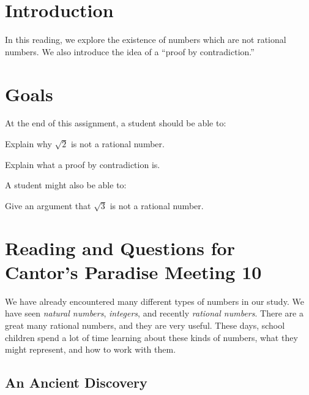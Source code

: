 \documentclass[12pt,letterpaper]{article}
\theoremstyle{definition}
\begin{document}
\setlength{\parskip}{1ex plus 0.5ex minus 0.2ex}
\setlength{\parindent}{0pt}

\pagestyle{fancy}
\cfoot{}

\section*{Introduction}
In this reading, we explore the existence of numbers which are not rational numbers.
We also introduce the idea of a ``proof by contradiction.''

\section*{Goals}
At the end of this assignment, a student should be able to:
\begin{compactitem}
\item Explain why $\sqrt{2}$ is not a rational number.
\item Explain what a proof by contradiction is.
\end{compactitem}
A student might also be able to:
\begin{compactitem}
\item Give an argument that $\sqrt{3}$ is not a rational number.
\end{compactitem}

\section*{Reading and Questions for Cantor's Paradise Meeting 10}

We have already encountered many different types of numbers in our study. 
We have seen \emph{natural numbers}, \emph{integers}, and recently \emph{rational numbers}.
There are a great many rational numbers, and they are very useful.
These days, school children spend a lot of time learning about these kinds of numbers, what they might represent, and how to work with them.

\subsection*{An Ancient Discovery}
\end{document}
